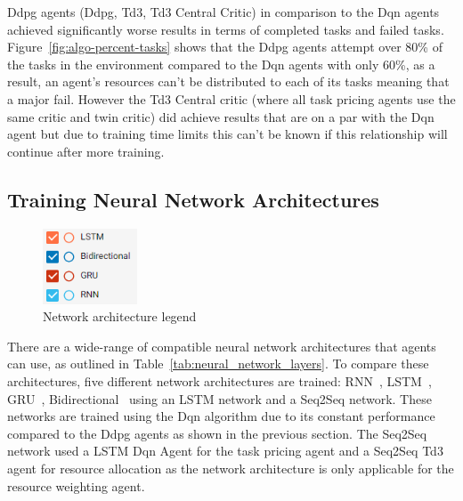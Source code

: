 Ddpg agents (Ddpg, Td3, Td3 Central Critic) in comparison to the Dqn agents achieved significantly worse results in
terms of completed tasks and failed tasks. Figure~\ref{fig:algo-percent-tasks} shows that the Ddpg agents attempt over
80\% of the tasks in the environment compared to the Dqn agents with only 60\%, as a result, an agent's resources can't
be distributed to each of its tasks meaning that a major fail. However the Td3 Central critic (where all task pricing
agents use the same critic and twin critic) did achieve results that are on a par with the Dqn agent but due to
training time limits this can't be known if this relationship will continue after more training.


\subsection{Training Neural Network Architectures}
\label{subsec:neural-network-architecture-training}
\begin{figure}
    \includegraphics[width=0.25\textwidth]{figures/5_evaluation_figs/net_arch_training_fig/legend.png}
    \caption{Network architecture legend}
    \label{fig:net-arch-training-legend}
\end{figure}

There are a wide-range of compatible neural network architectures that agents can use, as outlined in
Table~\ref{tab:neural_network_layers}. To compare these architectures, five different network architectures are trained:
RNN~\citep{RNN}, LSTM~\citep{LSTM}, GRU~\citep{GRU}, Bidirectional~\citep{Bidirectional} using an LSTM network and
a Seq2Seq network. These networks are trained using the Dqn algorithm due to its constant performance compared to the
Ddpg agents as shown in the previous section. The Seq2Seq network used a LSTM Dqn Agent for the task pricing agent and
a Seq2Seq Td3 agent for resource allocation as the network architecture is only applicable for the resource weighting
agent. \\

